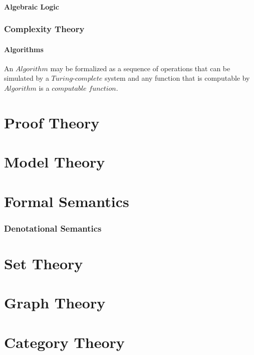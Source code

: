\documentclass{article}
\begin{document}
\subsection{Algebraic Logic}


\section{Complexity Theory}

\subsection{Algorithms}
    An $Algorithm$ may be formalized as a sequence of operations that
    can be simulated by a $Turing$-$complete$ system and any function
    that is computable by $Algorithm$ is a $computable$ $function$.

\part{Proof Theory}


\part{Model Theory}

\part{Formal Semantics}

\section{Denotational Semantics}

\part{Set Theory}

\part{Graph Theory}

\part{Category Theory}
\end{document}
